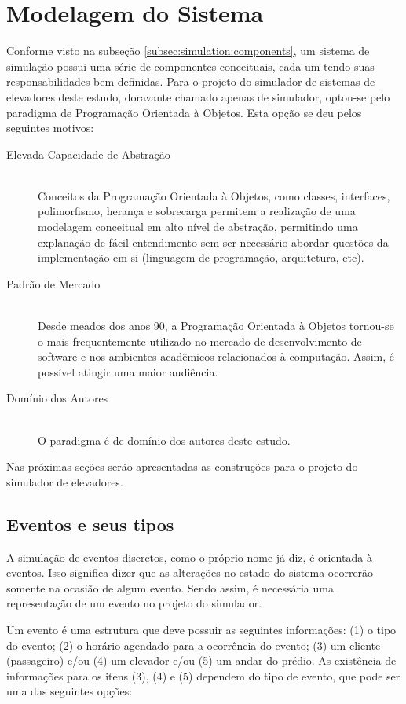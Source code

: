 \chapter{\label{chap:modeling}Modelagem do Sistema}

Conforme visto na subseção \ref{subsec:simulation:components}, um sistema de
simulação possui uma série de componentes conceituais, cada um tendo suas
responsabilidades bem definidas. Para o projeto do simulador de sistemas de
elevadores deste estudo, doravante chamado apenas de simulador, optou-se pelo
paradigma de Programação Orientada à Objetos. Esta opção se deu pelos seguintes
motivos:

\begin{description}
  \item[Elevada Capacidade de Abstração]\hfill \\
    Conceitos da Programação Orientada à Objetos, como classes, interfaces,
    polimorfismo, herança e sobrecarga permitem a realização de uma modelagem
    conceitual em alto nível de abstração, permitindo uma explanação de fácil
    entendimento sem ser necessário abordar questões da implementação em si
    (linguagem de programação, arquitetura, etc).
  \item[Padrão de Mercado]\hfill \\
    Desde meados dos anos 90, a Programação Orientada à Objetos tornou-se o mais
    frequentemente utilizado no mercado de desenvolvimento de software e nos
    ambientes acadêmicos relacionados à computação. Assim, é possível atingir
    uma maior audiência.
  \item[Domínio dos Autores]\hfill \\
    O paradigma é de domínio dos autores deste estudo.
\end{description}

Nas próximas seções serão apresentadas as construções para o projeto do
simulador de elevadores.

\section{Eventos e seus tipos}

A simulação de eventos discretos, como o próprio nome já diz, é orientada à
eventos. Isso significa dizer que as alterações no estado do sistema ocorrerão
somente na ocasião de algum evento. Sendo assim, é necessária uma representação
de um evento no projeto do simulador.

Um evento é uma estrutura que deve possuir as seguintes informações: (1) o tipo
do evento; (2) o horário agendado para a ocorrência do evento; (3) um cliente
(passageiro) e/ou (4) um elevador e/ou (5) um andar do prédio. As existência de
informações para os itens (3), (4) e (5) dependem do tipo de evento, que pode
ser uma das seguintes opções:

